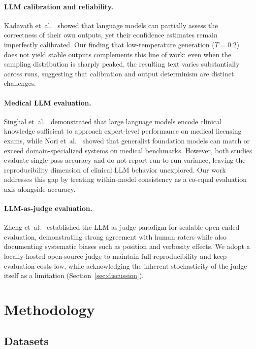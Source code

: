 \documentclass[11pt]{article}
\begin{document}
\paragraph{LLM calibration and reliability.}
Kadavath et~al.~\cite{kadavath2022calibration} showed that language
models can partially assess the correctness of their own outputs, yet
their confidence estimates remain imperfectly calibrated.
Our finding that low-temperature generation ($T{=}0.2$) does not yield
stable outputs complements this line of work: even when the sampling
distribution is sharply peaked, the resulting text varies substantially
across runs, suggesting that calibration and output determinism are
distinct challenges.

\paragraph{Medical LLM evaluation.}
Singhal et~al.~\cite{singhal2023large} demonstrated that large language
models encode clinical knowledge sufficient to approach expert-level
performance on medical licensing exams, while
Nori et~al.~\cite{nori2023gpt4med} showed that generalist foundation
models can match or exceed domain-specialized systems on medical
benchmarks.
However, both studies evaluate single-pass accuracy and do not report
run-to-run variance, leaving the reproducibility dimension of clinical
LLM behavior unexplored. Our work addresses this gap by treating
within-model consistency as a co-equal evaluation axis alongside
accuracy.

\paragraph{LLM-as-judge evaluation.}
Zheng et~al.~\cite{zheng2023judging} established the LLM-as-judge
paradigm for scalable open-ended evaluation, demonstrating strong
agreement with human raters while also documenting systematic biases
such as position and verbosity effects.
We adopt a locally-hosted open-source judge to maintain full
reproducibility and keep evaluation costs low, while acknowledging the
inherent stochasticity of the judge itself as a limitation
(Section~\ref{sec:discussion}).

\section{Methodology}

\subsection{Datasets}
\end{document}
